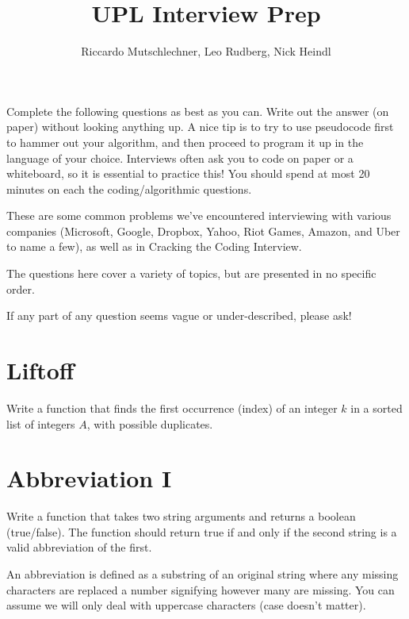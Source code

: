 \documentclass[12pt,runningheads]{article}
\begin{document}

\title{UPL Interview Prep}
\author{Riccardo Mutschlechner, Leo Rudberg, Nick Heindl}
\maketitle

Complete the following questions as best as you can. Write out the answer (on paper) without looking anything up. A nice tip is to try to use pseudocode first to hammer out your algorithm, and then proceed to program it up in the language of your choice. Interviews often ask you to code on paper or a whiteboard, so it is essential to practice this! You should spend at most 20 minutes on each the coding/algorithmic questions.

These are some common problems we've encountered interviewing with various companies (Microsoft, Google, Dropbox, Yahoo, Riot Games, Amazon, and Uber to name a few), as well as in Cracking the Coding Interview.

The questions here cover a variety of topics, but are presented in no specific order.

If any part of any question seems vague or under-described, please ask!

\newpage

\section{Liftoff}
Write a function that finds the first occurrence (index) of an integer $k$ in a sorted list of integers $A$, with possible duplicates.

\begin{comment}
This can be done most efficiently using two binary searches:
1) First find any instance of k using binary search
2) Then use a second binary search to find the _first instance_ of k
\end{comment}
\newpage

\section{Abbreviation I}
Write a function that takes two string arguments and returns a boolean (true/false). The function should return true if and only if the second string is a valid abbreviation of the first.

An abbreviation is defined as a substring of an original string where any missing characters are replaced a number signifying however many are missing. You can assume we will only deal with uppercase characters (case doesn't matter).
\end{document}
